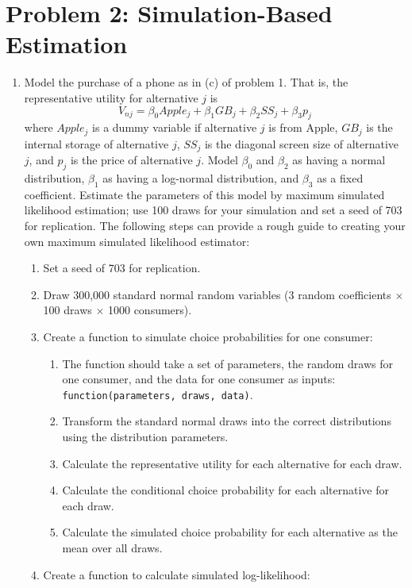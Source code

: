 \documentclass[11pt,letterpaper]{article}
\begin{document}
\section*{Problem 2: Simulation-Based Estimation}

\begin{enumerate}[label=\alph*., leftmargin=*]
	\item Model the purchase of a phone as in (c) of problem 1. That is, the representative utility for alternative $j$ is
	$$V_{nj} = \beta_0 Apple_j + \beta_1 GB_j + \beta_2 SS_j + \beta_3 p_j$$
	where $Apple_j$ is a dummy variable if alternative $j$ is from Apple, $GB_j$ is the internal storage of alternative $j$, $SS_j$ is the diagonal screen size of alternative $j$, and $p_j$ is the price of alternative $j$. Model $\beta_0$ and $\beta_2$ as having a normal distribution, $\beta_1$ as having a log-normal distribution, and $\beta_3$ as a fixed coefficient. Estimate the parameters of this model by maximum simulated likelihood estimation; use 100 draws for your simulation and set a seed of 703 for replication. The following steps can provide a rough guide to creating your own maximum simulated likelihood estimator:
	\begin{enumerate}[label=\Roman*.]
		\item Set a seed of 703 for replication.
		\item Draw 300,000 standard normal random variables (3 random coefficients $\times$ 100 draws $\times$ 1000 consumers).
		\item Create a function to simulate choice probabilities for one consumer:
		\begin{enumerate}[label=\roman*.]
			\item The function should take a set of parameters, the random draws for one consumer, and the data for one consumer as inputs: \texttt{function(parameters, draws, data)}.
			\item Transform the standard normal draws into the correct distributions using the distribution parameters.
			\item Calculate the representative utility for each alternative for each draw.
			\item Calculate the conditional choice probability for each alternative for each draw.
			\item Calculate the simulated choice probability for each alternative as the mean over all draws.
		\end{enumerate}
		\item Create a function to calculate simulated log-likelihood:

\end{enumerate}
\end{enumerate}
\end{document}

